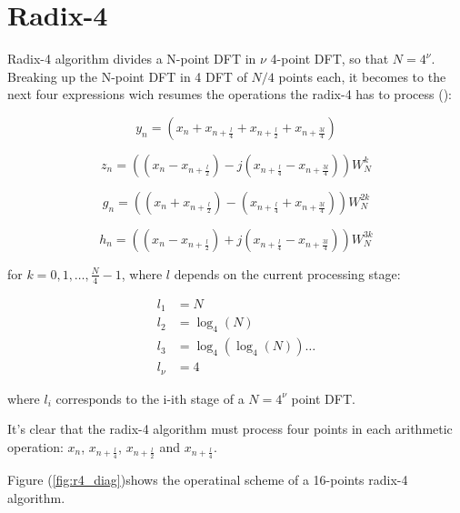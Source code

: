 \documentclass[conference]{IEEEtran}
\begin{document}
\section{Radix-4}

Radix-4 algorithm divides a N-point DFT in $\nu$ 4-point DFT, so that $N = 4^\nu$.\\
Breaking up the N-point DFT in 4 DFT of $N/4$ points each, it becomes to the next four expressions 
wich resumes the operations the radix-4 has to process (\cite{MeyerRadix}):

\begin{equation}
y_n = (x_n + x_{n+\frac{l}{4}} + x_{n+\frac{l}{2}} + x_{n+\frac{3l}{4}})
\label{eq:radix4_suby}
\end{equation}

\begin{equation}
z_n = ((x_n - x_{n+\frac{l}{2}}) -j (x_{n+\frac{l}{4}}
-x_{n+\frac{3l}{4}})) W_N^{k}
\label{eq:radix4_subz}
\end{equation}

\begin{equation}
g_n = ((x_n + x_{n+\frac{l}{2}}) - (x_{n+\frac{l}{4}}
+ x_{n+\frac{3l}{4}})) W_N^{2k}
\label{eq:radix4_subg}
\end{equation}

\begin{equation}
h_n = ((x_n - x_{n+\frac{l}{2}}) +j (x_{n+\frac{l}{4}} - x_{n+\frac{3l}{4}})) W_N^{3k}
\label{eq:radix4_subh}
\end{equation}

for $k = 0,1,\ldots,\frac{N}{4}-1$, where $l$ depends on the current processing stage:

\begin{equation}
\begin{split}
l_1 &= N \\
l_2 &= \log_4(N) \\
l_3 &= \log_4(\log_4(N)) \ldots\\
l_\nu &= 4
\end{split}
\label{eq:radix_4_arit_l}
\end{equation}

where $l_i$ corresponds to the i-ith stage of a $N=4^\nu$ point DFT.

It's clear that the radix-4 algorithm must process four points in each arithmetic operation: $x_n$,
$x_{n+\frac{l}{4}}$, $x_{n+\frac{l}{2}}$ and $x_{n+\frac{l}{4}}$.

Figure (\ref{fig:r4_diag})shows the operatinal scheme of a 16-points radix-4 algorithm.
\end{document}
